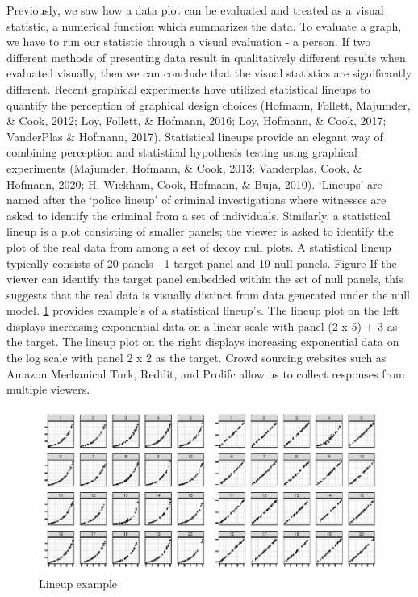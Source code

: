 \documentclass[print]{nuthesis}
\begin{document}
Previously, we saw how a data plot can be evaluated and treated as a visual statistic, a numerical function which summarizes the data.
To evaluate a graph, we have to run our statistic through a visual evaluation - a person.
If two different methods of presenting data result in qualitatively different results when evaluated visually, then we can conclude that the visual statistics are significantly different.
Recent graphical experiments have utilized statistical lineups to quantify the perception of graphical design choices
(Hofmann, Follett, Majumder, \& Cook, 2012; Loy, Follett, \& Hofmann, 2016; Loy, Hofmann, \& Cook, 2017; VanderPlas \& Hofmann, 2017).
Statistical lineups provide an elegant way of combining perception and statistical hypothesis testing using graphical experiments (Majumder, Hofmann, \& Cook, 2013; Vanderplas, Cook, \& Hofmann, 2020; H. Wickham, Cook, Hofmann, \& Buja, 2010).
`Lineups' are named after the `police lineup' of criminal investigations where witnesses are asked to identify the criminal from a set of individuals.
Similarly, a statistical lineup is a plot consisting of smaller panels; the viewer is asked to identify the plot of the real data from among a set of decoy null plots.
A statistical lineup typically consists of 20 panels - 1 target panel and 19 null panels. Figure
If the viewer can identify the target panel embedded within the set of null panels, this suggests that the real data is visually distinct from data generated under the null model.
\ref{fig:lineup-example} provides example's of a statistical lineup's. The lineup plot on the left displays increasing exponential data on a linear scale with panel (2 x 5) + 3 as the target.
The lineup plot on the right displays increasing exponential data on the log scale with panel 2 x 2 as the
target.
Crowd sourcing websites such as Amazon Mechanical Turk, Reddit, and Prolifc allow us to collect responses from multiple viewers.

\begin{figure}

{\centering \includegraphics[width=\linewidth]{thesis_files/figure-latex/lineup-example-1} 

}

\caption{Lineup example}\label{fig:lineup-example}
\end{figure}
\end{document}
